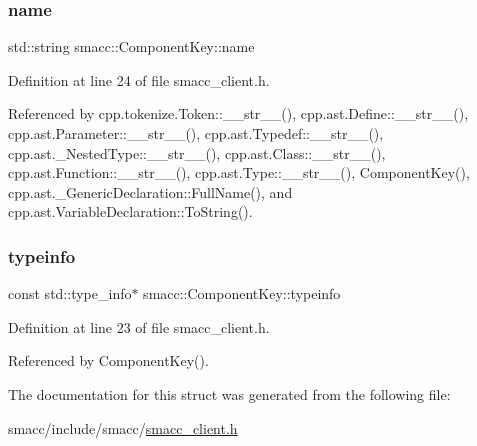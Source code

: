 \subsubsection{\texorpdfstring{name}{name}}
{\footnotesize\ttfamily std\+::string smacc\+::\+Component\+Key\+::name}



Definition at line 24 of file smacc\+\_\+client.\+h.



Referenced by cpp.\+tokenize.\+Token\+::\+\_\+\+\_\+str\+\_\+\+\_\+(), cpp.\+ast.\+Define\+::\+\_\+\+\_\+str\+\_\+\+\_\+(), cpp.\+ast.\+Parameter\+::\+\_\+\+\_\+str\+\_\+\+\_\+(), cpp.\+ast.\+Typedef\+::\+\_\+\+\_\+str\+\_\+\+\_\+(), cpp.\+ast.\+\_\+\+Nested\+Type\+::\+\_\+\+\_\+str\+\_\+\+\_\+(), cpp.\+ast.\+Class\+::\+\_\+\+\_\+str\+\_\+\+\_\+(), cpp.\+ast.\+Function\+::\+\_\+\+\_\+str\+\_\+\+\_\+(), cpp.\+ast.\+Type\+::\+\_\+\+\_\+str\+\_\+\+\_\+(), Component\+Key(), cpp.\+ast.\+\_\+\+Generic\+Declaration\+::\+Full\+Name(), and cpp.\+ast.\+Variable\+Declaration\+::\+To\+String().

\mbox{\label{structsmacc_1_1ComponentKey_a148bab7ba01039d4bcabfd93529b333a}} 
\subsubsection{\texorpdfstring{typeinfo}{typeinfo}}
{\footnotesize\ttfamily const std\+::type\+\_\+info$\ast$ smacc\+::\+Component\+Key\+::typeinfo}



Definition at line 23 of file smacc\+\_\+client.\+h.



Referenced by Component\+Key().



The documentation for this struct was generated from the following file\+:\begin{DoxyCompactItemize}
\item 
smacc/include/smacc/\hyperlink{smacc__client_8h}{smacc\+\_\+client.\+h}\end{DoxyCompactItemize}
